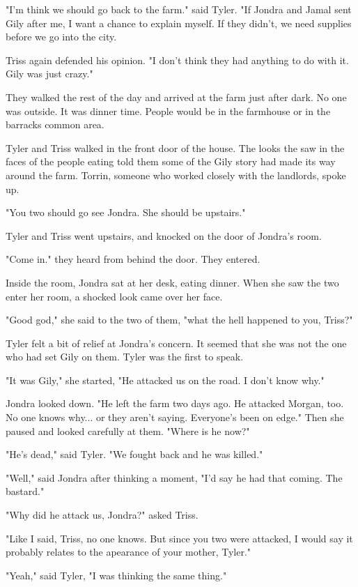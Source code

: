 \documentclass[courier]{sffms}
\begin{document}
"I'm think we should go back to the farm." said Tyler.
"If Jondra and Jamal sent Gily after me, I want a
chance to explain myself. If they didn't, we need
supplies before we go into the city.

Triss again defended his opinion. "I don't think they
had anything to do with it. Gily was just crazy."

They walked the rest of the day and arrived at the
farm just after dark. No one was outside. It was
dinner time. People would be in the farmhouse or
in the barracks common area.

Tyler and Triss walked in the front door of the house.
The looks the saw in the faces of the people eating
told them some of the Gily story had made its way
around the farm. Torrin, someone who worked
closely with the landlords, spoke up.

"You two should go see Jondra. She should be
upstairs."

Tyler and Triss went upstairs, and knocked on the
door of Jondra's room.

"Come in." they heard from behind the door. They
entered.

Inside the room, Jondra sat at her desk, eating
dinner. When she saw the two enter her room, a
shocked look came over her face.

"Good god," she said to the two of them, "what
the hell happened to you, Triss?"

Tyler felt a bit of relief at Jondra's concern. It seemed
that she was not the one who had set Gily on them.
Tyler was the first to speak.

"It was Gily," she started, "He attacked us on the
road. I don't know why."

Jondra looked down. "He left the farm two days ago.
He attacked Morgan, too. No one knows why... or they
aren't saying. Everyone's been on edge." Then she
paused and looked carefully at them. "Where is he
now?"

"He's dead," said Tyler. "We fought back and he
was killed."

"Well," said Jondra after thinking a moment, "I'd say
he had that coming. The bastard."

"Why did he attack us, Jondra?" asked Triss.

"Like I said, Triss, no one knows. But since you two
were attacked, I would say it probably relates to the
apearance of your mother, Tyler."

"Yeah," said Tyler, "I was thinking the same thing."
\end{document}
